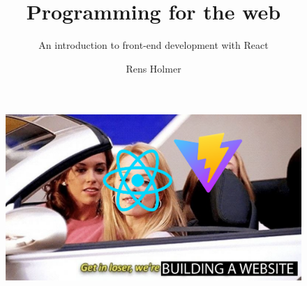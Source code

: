 \documentclass[10pt]{beamer}
\title{Programming for the web}
\subtitle{An introduction to front-end development with React}
\author{Rens Holmer}
\institute{Wageningen University -- Bioinformatics}
\begin{document}
\begin{frame}
    \titlepage
    \begin{figure}
        \includegraphics[width=.7\linewidth]{figures/get-in-loser.pdf}
    \end{figure}
\end{frame}
\end{document}
